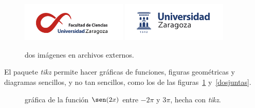 \documentclass[11pt]{book}
\theoremstyle{plain} %
\theoremstyle{definition} %
\begin{document}
\begin{figure}[ht]%
\centering
\includegraphics[width=0.45\textwidth]{ciencias.png}
\qquad
\includegraphics[width=0.45\textwidth]{logoUZ.png}
\caption{dos imágenes en archivos externos.}
\end{figure}

El paquete \emph{tikz} permite hacer gráficas de funciones, 
figuras geométricas y diagramas sencillos, y no tan sencillos, como los de las 
figuras~\ref{graf-seno} y~\ref{dosjuntas}.

\begin{figure}[ht]%
\centering
\caption{gráfica de la función $\sen(2x)$ entre $-2\pi$ y $3\pi$, hecha con \emph{tikz}.}
\label{graf-seno}
\end{figure}
\end{document}
